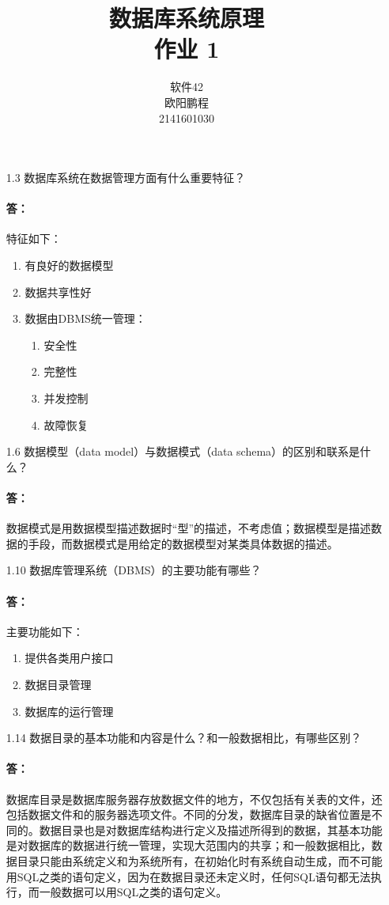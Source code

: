 \documentclass[UTF8]{ctexart}
\title{数据库系统原理 \\ 作业 1}
\author{软件42 \\ 欧阳鹏程 \\ 2141601030}
\begin{document}
\maketitle

\begin{itemize}
	\item[1.3] 数据库系统在数据管理方面有什么重要特征？
	\paragraph{答：}特征如下：
	\begin{enumerate}
		\item 有良好的数据模型
		\item 数据共享性好
		\item 数据由DBMS统一管理：
		\begin{enumerate}
			\item 安全性
			\item 完整性
			\item 并发控制
			\item 故障恢复
		\end{enumerate}
	\end{enumerate}

	\item[1.6] 数据模型（data model）与数据模式（data schema）的区别和联系是什么？
	\paragraph{答：}
	数据模式是用数据模型描述数据时“型”的描述，不考虑值；数据模型是描述数据的手段，而数据模式是用给定的数据模型对某类具体数据的描述。
	
	\item[1.10] 数据库管理系统（DBMS）的主要功能有哪些？
	\paragraph{答：}主要功能如下：
	\begin{enumerate}
		\item 提供各类用户接口
		\item 数据目录管理
		\item 数据库的运行管理
	\end{enumerate}

	\item[1.14] 数据目录的基本功能和内容是什么？和一般数据相比，有哪些区别？
	\paragraph{答：}数据库目录是数据库服务器存放数据文件的地方，不仅包括有关表的文件，还包括数据文件和的服务器选项文件。不同的分发，数据库目录的缺省位置是不同的。数据目录也是对数据库结构进行定义及描述所得到的数据，其基本功能是对数据库的数据进行统一管理，实现大范围内的共享；和一般数据相比，数据目录只能由系统定义和为系统所有，在初始化时有系统自动生成，而不可能用SQL之类的语句定义，因为在数据目录还未定义时，任何SQL语句都无法执行，而一般数据可以用SQL之类的语句定义。
\end{itemize}
\end{document}
